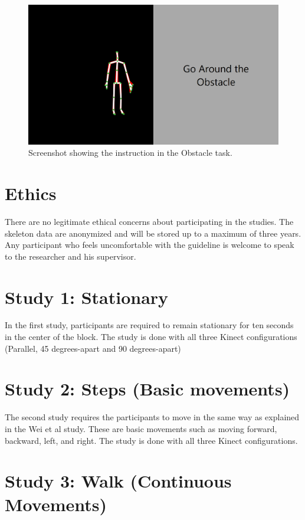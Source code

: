 \begin{figure}[!h]
  \centering

  \includegraphics[width=0.6\linewidth]{figs/obstacle_task_instruction}
  
  \caption{Screenshot showing the instruction in the Obstacle task.}

  \label{fig:obstacle_task_instruction}
\end{figure}

\section{Ethics}
\label{sec:studies_ethics}

There are no legitimate ethical concerns about participating in the studies. The skeleton data are anonymized and will be stored up to a maximum of three years. Any participant who feels uncomfortable with the guideline is welcome to speak to the researcher and his supervisor.

\section{Study 1: Stationary}
\label{sec:studies_stationary}

In the first study, participants are required to remain stationary for ten seconds in the center of the block. The study is done with all three Kinect configurations (Parallel, 45 degrees-apart and 90 degrees-apart)

\section{Study 2: Steps (Basic movements)}
\label{sec:studies_stationary}

The second study requires the participants to move in the same way as explained in the Wei et al study. These are basic movements such as moving forward, backward, left, and right. The study is done with all three Kinect configurations.

\section{Study 3: Walk (Continuous Movements)}
\label{sec:studies_stationary}

